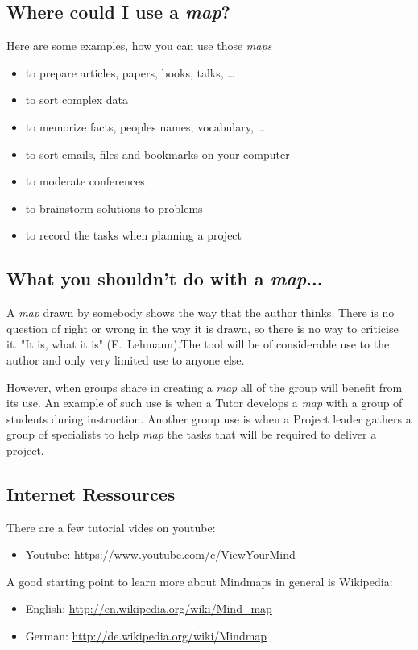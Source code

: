 \documentclass[12pt,a4paper]{article}
\begin{document}
\subsection{Where could I use a {\em map}?}
Here are some examples, how you can use those {\em maps}
\begin{itemize}
    \item to prepare articles, papers, books, talks, \ldots
    \item to sort complex data
    \item to memorize facts, peoples names, vocabulary, \ldots
    \item to sort emails, files and bookmarks on your computer
    \item to moderate conferences
    \item to brainstorm solutions to problems
    \item to record the tasks when planning a project
\end{itemize}

\subsection{What you shouldn't do with a {\em map}...}
A {\em map} drawn by somebody shows the way that the author thinks.
There is no question of right or wrong in the way it is drawn, so there
is no way to criticise it. "It is, what it is" ({\sc F.~Lehmann}).The
tool will be of considerable use to the author and only very limited use
to anyone else. 

However, when groups share in creating a {\em map} all of the group will
benefit from its use. An example of such use is when a Tutor develops a
{\em map} with a group of students during instruction. Another group use
is when a Project leader gathers a group of specialists to help {\em
map} the tasks that will be required to deliver a project.


\subsection{Internet Ressources} 
There are a few tutorial vides on youtube:
\begin{itemize}
    \item Youtube: 
        \href{https://www.youtube.com/c/ViewYourMind}{https://www.youtube.com/c/ViewYourMind}
\end{itemize}
A good starting point to learn more about Mindmaps in general is Wikipedia:
\begin{itemize}
    \item English: 
        \href{http://en.wikipedia.org/wiki/Mind_map}{http://en.wikipedia.org/wiki/Mind\_map}
    \item German: 
        \href{http://de.wikipedia.org/wiki/Mindmap}{http://de.wikipedia.org/wiki/Mindmap}
\end{itemize}
\end{document}
